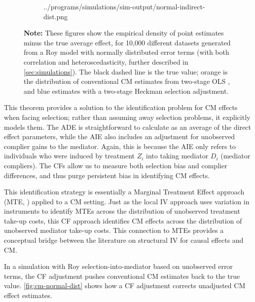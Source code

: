 \begin{figure}[!h]
\begin{subfigure}[c]{0.475\textwidth}
{            ../programs/simulations/sim-output/normal-indirect-dist.png}
    \end{subfigure}
    \label{fig:cm-normal-dist}
    \justify
    \footnotesize
    \textbf{Note:}
    These figures show the empirical density of point estimates minus the true average effect, for 10,000 different datasets generated from a Roy model with normally distributed error terms (with both correlation and heteroscedasticity, further described in \autoref{sec:simulations}).
    The black dashed line is the true value;
    orange is the distribution of conventional CM estimates from two-stage OLS \citep{imai2010identification},
    and blue estimates with a two-stage Heckman selection adjustment.
\end{figure}

This theorem provides a solution to the identification problem for CM effects when facing selection;
rather than assuming away selection problems, it explicitly models them.
The ADE is straightforward to calculate as an average of the direct effect parameters, while the AIE also includes an adjustment for unobserved complier gains to the mediator.
Again, this is because the AIE only refers to individuals who were induced by treatment $Z_i$ into taking mediator $D_i$ (mediator compliers).
The CFs allow us to measure both selection bias and complier differences, and thus purge persistent bias in identifying CM effects.

This identification strategy is essentially a Marginal Treatment Effect approach (MTE, \citealt{bjorklund1987estimation,heckman2005structural}) applied to a CM setting.
Just as the local IV approach uses variation in instruments to identify MTEs across the distribution of unobserved treatment take-up costs, this CF approach identifies CM effects across the distribution of unobserved mediator take-up costs.
This connection to MTEs provides a conceptual bridge between the literature on structural IV for causal effects and CM.

In a simulation with Roy selection-into-mediator based on unobserved error terms, the CF adjustment pushes conventional CM estimates back to the true value. 
\autoref{fig:cm-normal-dist} shows how a CF adjustment corrects unadjusted CM effect estimates.
